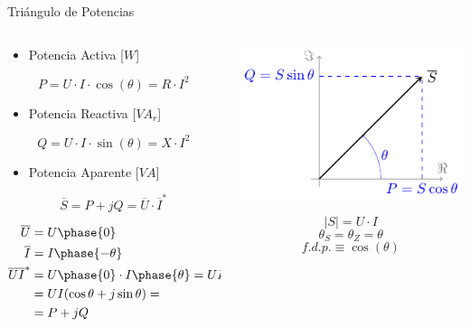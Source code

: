 \documentclass[aspectratio=169, usenames,svgnames,dvipsnames]{beamer}
\begin{document}
\begin{frame}[label={sec:orgd3dc05f}]{Triángulo de Potencias}
\begin{columns}
\begin{column}{0.4\columnwidth}
\begin{itemize}
\item Potencia Activa [\(W\)]
\end{itemize}
\[  
\boxed{P = U\cdot I\cdot\cos(\theta) = R \cdot I^2}
\]

\begin{itemize}
\item Potencia Reactiva [\(VA_r\)]
\end{itemize}
\[
\boxed{Q = U\cdot I\cdot\sin(\theta) = X \cdot I^2}
\]

\begin{itemize}
\item Potencia Aparente [\(VA\)]
\end{itemize}
\[
\boxed{\overline{S} = P + jQ = \overline{U} \cdot \overline{I}^*}
\]

{\footnotesize\begin{align*}
  \overline{U} &= U\phase{0}\\
  \overline{I} &= I\phase{-\theta}\\
                \overline{U} \overline{I}^* &= U\phase{0} \cdot I\phase{\theta} = UI\phase{\theta}\\
                &= U I (\cos\theta + j \sin\theta) = \\
                &= P + j Q
\end{align*}}
\end{column}

\begin{column}{0.6\columnwidth}
\begin{center}
\includegraphics[width=.9\linewidth]{../figs/trianguloPotencias.pdf}
\end{center}

\[
|S| = U \cdot I
\]
\[
\theta_S = \theta_Z = \theta
\]
\[
f.d.p. \equiv \cos(\theta)
\]
\end{column}
\end{columns}
\end{frame}
\end{document}
